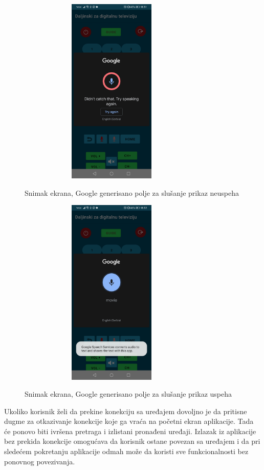 \documentclass[implementacija.tex]{subfiles}
\begin{document}
\begin{figure}[h!]
\centering
\begin{minipage}{.5\textwidth}
  \centering
  \label{fig:google_neuspesno}
  \includegraphics[width=9cm,height=9cm,keepaspectratio]{Implementacija/snimci_ekrana/11_obican_google_neuspesno.jpg}
  \caption{Snimak ekrana, Google generisano polje za slušanje prikaz neuspeha}
\end{minipage}%
\begin{minipage}{.5\textwidth}
  \centering
  \label{fig:google_uspesno}
  \includegraphics[width=9cm,height=9cm,keepaspectratio]{Implementacija/snimci_ekrana/11_obican_google_uspesno.jpg}
  \caption{Snimak ekrana, Google generisano polje za slušanje prikaz uspeha}
\end{minipage}
\end{figure}

Ukoliko korisnik želi da prekine konekciju sa uređajem dovoljno je da pritisne dugme za otkazivanje konekcije koje ga vraća na početni ekran aplikacije. Tada će ponovo biti ivršena pretraga i izlistani pronađeni uređaji. Izlazak iz aplikacije bez prekida konekcije omogućava da korisnik ostane povezan sa uređajem i da pri sledećem pokretanju aplikacije odmah može da koristi sve funkcionalnosti bez ponovnog povezivanja.
\end{document}
